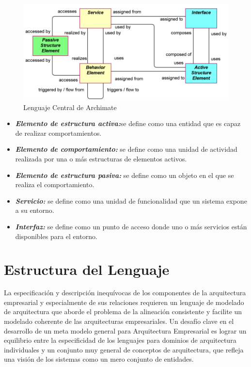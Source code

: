 \begin{figure}[h!]
	\centering
	\includegraphics[width=1\linewidth]{ARQUITECTURA/imgs/central}
	\caption{Lenguaje Central de Archimate}
	\label{central}
\end{figure}

\begin{itemize}
	
	\item  \textbf{\textit{Elemento de estructura activa:}}se define como una entidad que es capaz de realizar comportamientos.
	
	\item  \textbf{\textit{Elemento de comportamiento:}} se define como una unidad de actividad realizada por una o más estructuras de elementos activos.
	
	\item  \textbf{\textit{Elemento de estructura pasiva:}} se define como un objeto en el que se realiza el comportamiento.
	
	\item  \textbf{\textit{Servicio:}} se define como una unidad de funcionalidad que un sistema expone a su entorno.
	
	\item  \textbf{\textit{Interfaz:}} se define como un punto de acceso donde uno o más servicios están disponibles para el entorno.
	
\end{itemize}
\newpage
\section{Estructura del Lenguaje}
La especificación y descripción inequívocas de los componentes de la arquitectura empresarial y especialmente de sus relaciones requieren un lenguaje de modelado de arquitectura que aborde el problema de la alineación consistente y facilite un modelado coherente de las arquitecturas empresariales. Un desafío clave en el desarrollo de un meta modelo general para Arquitectura Empresarial es lograr un equilibrio entre la especificidad de los lenguajes para dominios de arquitectura individuales y un conjunto muy general de conceptos de arquitectura, que refleja una visión de los sistemas como un mero conjunto de entidades.

